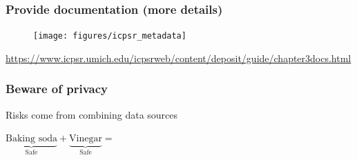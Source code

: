 \documentclass[aspectratio=169]{beamer}
\begin{document}
\begin{frame}
\frametitle{Provide documentation (more details)}

\begin{figure}
  \centering
  \texttt{[image: figures/icpsr\_metadata]}
\end{figure}

\vfill
\url{https://www.icpsr.umich.edu/icpsrweb/content/deposit/guide/chapter3docs.html}

\end{frame}
\begin{frame}
\frametitle{Beware of privacy}

Risks come from combining data sources\\

\vfill

\begin{minipage}[c]{0.35\textwidth}
$\underbrace{\text{Baking soda}}_{\text{Safe}} + \underbrace{\text{Vinegar}}_{\text{Safe}} =$
\end{minipage}
\hspace{0.05\textwidth}
\begin{minipage}[c]{0.55\textwidth}
\end{minipage}

\end{frame}
\end{document}

